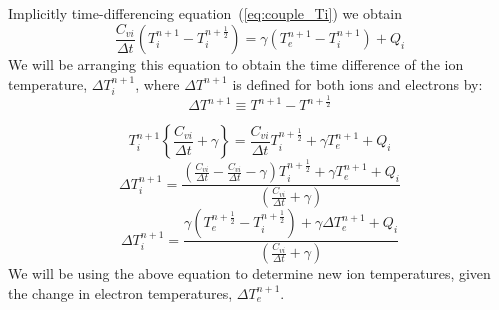 \documentclass{article}
\newcommand{\dt}{\ensuremath{\Delta t}}
\newcommand{\cviOdt}{\ensuremath{\frac{C_{vi}}{\dt}}}
\begin{document}
Implicitly time-differencing equation~(\ref{eq:couple_Ti}) we obtain
\begin{equation}
        \cviOdt ( T_{i}^{n+1}-T_{i}^{n+\frac{1}{2}}) =
                 \gamma (T_{e}^{n+1}-T_{i}^{n+1}) + Q_{i}
\end{equation}
We will be arranging this equation to obtain the time difference of
the ion temperature, $\Delta T_{i}^{n+1}$,
where $\Delta T^{n+1}$ is defined for both ions and electrons by:
\begin{equation}
   \boxed{
        \Delta T^{n+1} \equiv T^{n+1} - T^{n+\frac{1}{2}}
   }
\end{equation}

\begin{equation}
        T_{i}^{n+1}\left\{ \cviOdt + \gamma \right\} =
                \cviOdt T_{i}^{n+\frac{1}{2}} + \gamma T_{e}^{n+1} + Q_{i}
\end{equation}
\begin{equation}
        \Delta T_{i}^{n+1} = \frac{ \left( \cviOdt - \cviOdt - \gamma 
                                        \right) T_{i}^{n+\frac{1}{2}}
                         + \gamma T_{e}^{n+1} + Q_{i} }
                {(\cviOdt + \gamma)}
\end{equation}
\begin{equation}
   \boxed{
        \Delta T_{i}^{n+1} = \frac{ \gamma ( T_{e}^{n+\frac{1}{2}} - T_{i}^{n+\frac{1}{2}} )
                                + \gamma \Delta T_{e}^{n+1} + Q_{i} }
                {(\cviOdt + \gamma)}
         }
\label{eq:Tinp1}
\end{equation}
We will be using the above equation to determine new ion temperatures,
given the change in electron temperatures, $\Delta T_{e}^{n+1}$.
\end{document}
